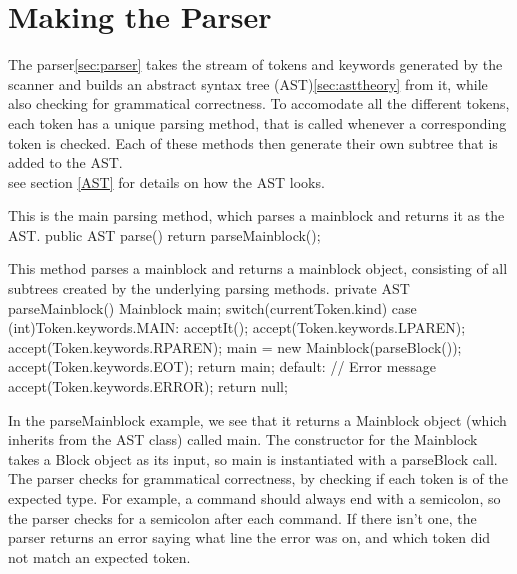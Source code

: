 \section{Making the Parser}
The parser\ref{sec:parser} takes the stream of tokens and keywords generated by the scanner and builds an abstract syntax tree (AST)\ref{sec:asttheory} from it, while also checking for grammatical correctness.
To accomodate all the different tokens, each token has a unique parsing method, that is called whenever a corresponding token is checked.
Each of these methods then generate their own subtree that is added to the AST. \\
see section \ref{AST} for details on how the AST looks.

\begin{source}{This is the main parsing method, which parses a mainblock and returns it as the AST.}{}
public AST parse()
        {
            return parseMainblock();
        }
\end{source}
\begin{source}{This method parses a mainblock and returns a mainblock object, consisting of all subtrees created by the underlying parsing methods.}{}
private AST parseMainblock()
        {
            Mainblock main;
            switch(currentToken.kind)
            {
                case (int)Token.keywords.MAIN:
                    acceptIt();
                    accept(Token.keywords.LPAREN);
                    accept(Token.keywords.RPAREN);
                    main = new Mainblock(parseBlock());
                    accept(Token.keywords.EOT);
                    return main;
                default:
                    // Error message
                    accept(Token.keywords.ERROR);
                    return null;
            }
        }
\end{source}
In the parseMainblock example, we see that it returns a Mainblock object (which inherits from the AST class) called main. 
The constructor for the Mainblock takes a Block object as its input, so main is instantiated with a parseBlock call. \\
The parser checks for grammatical correctness, by checking if each token is of the expected type. 
For example, a command should always end with a semicolon, so the parser checks for a semicolon after each command. 
If there isn't one, the parser returns an error saying what line the error was on, and which token did not match an expected token.